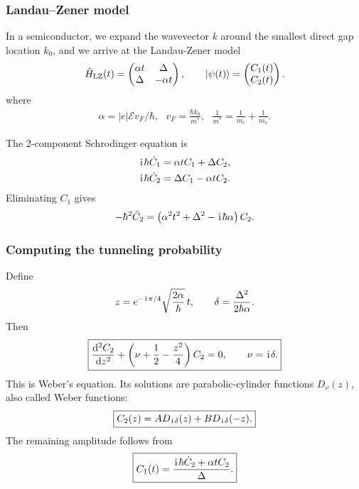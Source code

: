 \subsubsection{Landau--Zener model}
In a semiconductor, we expand the wavevector $k$ around the smallest direct gap location $k_0$, and we arrive at the Landau-Zener model
\begin{equation}
\hat H_{\mathrm{LZ}}(t)=
\begin{pmatrix}
\alpha t&\Delta\\
\Delta&-\alpha t
\end{pmatrix},
\qquad
|{\psi(t)}\rangle=
\begin{pmatrix}C_1(t)\\C_2(t)\end{pmatrix}.
\end{equation}
where
\begin{align}
    \alpha=|e|\mathcal E v_F/\hbar,~~~v_F=\frac{\hbar k_0}{m^\ast},~~~\frac1{m^*}=\frac1{m_c}+\frac1{m_v}.
\end{align}

The 2-component Schrodinger equation is
\begin{align}
\hspace{1pt}\mathrm{i}\hspace{1pt}\hbar\dot C_1&=\alpha tC_1+\Delta C_2,\\
\hspace{1pt}\mathrm{i}\hspace{1pt}\hbar\dot C_2&=\Delta C_1-\alpha tC_2.
\end{align}
Eliminating $C_1$ gives
\begin{equation}
-\hbar^2\ddot C_2
=\left(\alpha^2t^2+\Delta^2-\hspace{1pt}\mathrm{i}\hspace{1pt}\hbar\alpha\right)C_2.
\end{equation}






\subsubsection{Computing the tunneling probability}
Define
\begin{equation}
 z=e^{-\hspace{1pt}\mathrm{i}\hspace{1pt}\pi/4}\sqrt{\frac{2\alpha}{\hbar}}\,t,
 \qquad
 \delta=\frac{\Delta^2}{2\hbar\alpha}.
\end{equation}
Then
\begin{equation}
 \boxed{
 \frac{\mathrm{d}^2C_2}{\mathrm{d} z^2}
 +\left(\nu+\frac12-\frac{z^2}{4}\right)C_2=0,
 \qquad \nu=\hspace{1pt}\mathrm{i}\hspace{1pt}\delta.}
\end{equation}
This is Weber's equation. Its solutions are parabolic-cylinder functions $D_\nu(z)$,
also called Weber functions:
\begin{equation}
 \boxed{C_2(z)=A D_{\hspace{1pt}\mathrm{i}\hspace{1pt}\delta}(z)
 +B D_{\hspace{1pt}\mathrm{i}\hspace{1pt}\delta}(-z).}
\end{equation}
The remaining amplitude follows from
\begin{equation}
 \boxed{C_1(t)=\frac{\hspace{1pt}\mathrm{i}\hspace{1pt}\hbar\dot C_2+\alpha tC_2}{\Delta}.}
\end{equation}

